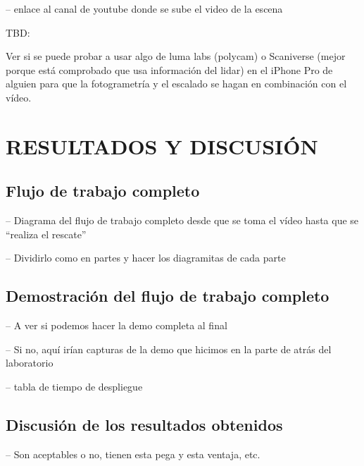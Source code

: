 \documentclass[a4paper, 12pt, spanish, twoside]{article}
\begin{document}
-- enlace al canal de youtube donde se sube el video de la escena 

TBD: 

Ver si se puede probar a usar algo de luma labs (polycam) o Scaniverse (mejor porque está comprobado que usa información del \acrshort{lidar}) en el iPhone Pro de alguien para que la fotogrametría y el escalado se hagan en combinación con el vídeo.  

\clearpage





\newpage
\section{RESULTADOS Y DISCUSIÓN} \label{sec:resultados-y-discusion}

\subsection{Flujo de trabajo completo} \label{sec:resultados-y-discusion:flujo-completo}

-- Diagrama del flujo de trabajo completo desde que se toma el vídeo hasta que se “realiza el rescate” 

-- Dividirlo como en partes y hacer los diagramitas de cada parte 

\subsection{Demostración del flujo de trabajo completo} \label{sec:resultados-y-discusion:demo}

-- A ver si podemos hacer la demo completa al final 

-- Si no, aquí irían capturas de la demo que hicimos en la parte de atrás del laboratorio 

-- tabla de tiempo de despliegue 

\subsection{Discusión de los resultados obtenidos} \label{sec:resultados-y-discusion:discusion}

-- Son aceptables o no, tienen esta pega y esta ventaja, etc. 
\end{document}

